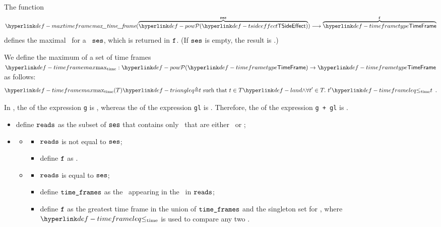 \hypertarget{def-maxtimeframe}{}
The function
\[
    \maxtimeframe(\overname{\TSideEffectSet}{\vses}) \aslto \overname{\TTimeFrame}{\vf}
\]
defines the maximal \timeframeterm\ for a \sideeffectsetterm\ $\texttt{ses}$, which is returned
in $\texttt{f}$.
(If $\texttt{ses}$ is empty, the result is \timeframeconstant.)

\hypertarget{def-timeframemax}{}
We define the maximum of a set of time frames $\timeframemax : \pow{\TTimeFrame} \rightarrow \TTimeFrame$
as follows:
\[
    \timeframemax(T) \triangleq t \text{ such that } t\in T \land \forall t'\in T.\ t' \timeframeleq t \enspace.
\]

In , the \timeframeterm{} of the expression \verb|g| is \timeframeconstant,
whereas the \timeframeterm{} of the expression \verb|gl| is \timeframeexecution.
Therefore, the \timeframeterm{} of the expression \verb|g + gl| is \timeframeexecution.

\ProseParagraph
\AllApply
\begin{itemize}
    \item define $\texttt{reads}$ as the subset of $\texttt{ses}$ that contains only
    \sideeffectdescriptorsterm\ that are either \ReadLocalTerm\ or \ReadGlobalTerm;
    \item \OneApplies
    \begin{itemize}
        \item {}
        \begin{itemize}
            \item $\texttt{reads}$ is not equal to $\texttt{ses}$;
            \item define $\texttt{f}$ as \timeframeexecution.
        \end{itemize}

        \item {}
        \begin{itemize}
            \item $\texttt{reads}$ is equal to $\texttt{ses}$;
            \item define $\texttt{time\_frames}$ as the \timeframesterm\ appearing in the \sideeffectdescriptorsterm\
                in $\texttt{reads}$;
            \item define $\texttt{f}$ as the greatest time frame in the union of $\texttt{time\_frames}$ and the singleton set for \timeframeconstant,
                where $\timeframeleq$ is used to compare any two \timeframesterm.
        \end{itemize}
    \end{itemize}
\end{itemize}

